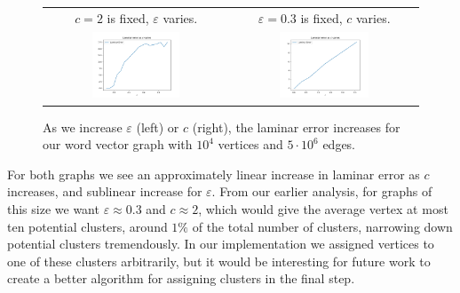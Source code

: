 \documentclass[
]{article}
\begin{document}
\begin{figure}[!htb]
  \begin{tabular}{cc}
    {\(c = 2\)} is fixed, {\(\varepsilon\)} varies. & {\(\varepsilon = 0.3\)} is fixed, {\(c\)} varies. \\
    \includegraphics[width=0.5\textwidth]{images/laminar_error_as_epsilon_varies_word_vector.png}
                                                    &
    \includegraphics[width=0.5\textwidth]{images/laminar_error_as_c_varies_word_vector.png}             \\
  \end{tabular}
  \caption{\label{fig:laminar-error-word-vector-graph}
    As we increase $\varepsilon$ (left) or $c$ (right), the laminar error increases for our word vector graph with $10^4$ vertices and $5\cdot 10^6$ edges.}
\end{figure}

For both graphs we see an approximately linear increase in laminar error as {\(c\)}
increases, and sublinear increase for {\(\varepsilon\)}. From our
earlier analysis, for graphs of this size we want
  {\(\varepsilon \approx 0.3\)} and {\(c \approx 2\)}, which would give
the average vertex at most ten potential clusters, around {\(1\%\)} of
the total number of clusters, narrowing down potential clusters tremendously. In our implementation we assigned vertices to one of these clusters arbitrarily, but it would be interesting for future work to create a better algorithm for assigning clusters in the final step.
\end{document}
